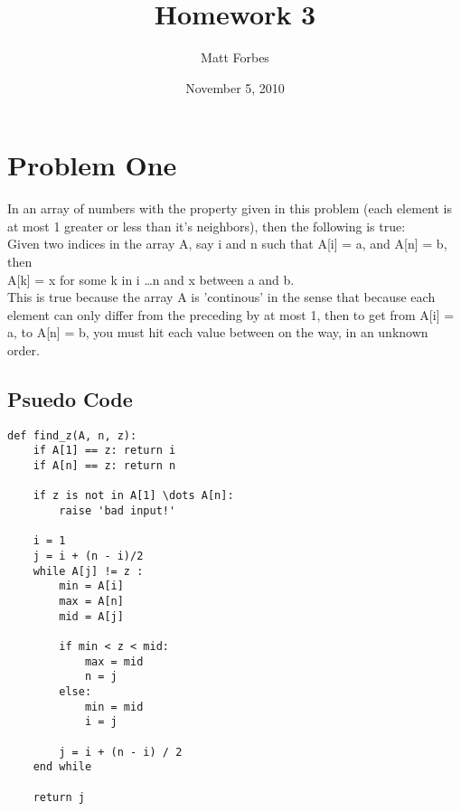 \documentclass[a4paper,12pt]{article}
\begin{document}
\title{Homework 3}
\author{Matt Forbes}
\date{November 5, 2010}
\maketitle

\newenvironment{indentpar}[1]%
{\begin{list}{}%
         {\setlength{\leftmargin}{#1}}%
         \item[]%
}
{\end{list}}

\section{Problem One}

In an array of numbers with the property given in this problem (each element is at most 1 greater or less than 
it's neighbors), then the following is true:\\

\noindent Given two indices in the array A, say i and n such that A[i] = a, and A[n] = b, then\\ A[k] = x
for some k in i \dots n and x between a and b.\\

\noindent This is true because the array A is 'continous' in the sense that because each element can
only differ from the preceding by at most 1, then to get from A[i] = a, to A[n] = b, you must hit each
value between on the way, in an unknown order.

\subsection*{Psuedo Code}
\begin{verbatim}
def find_z(A, n, z):
    if A[1] == z: return i
    if A[n] == z: return n

    if z is not in A[1] \dots A[n]:
        raise 'bad input!'

    i = 1
    j = i + (n - i)/2   
    while A[j] != z :
        min = A[i]
        max = A[n]
        mid = A[j]

        if min < z < mid:  
            max = mid
            n = j
        else:
            min = mid
            i = j
        
        j = i + (n - i) / 2   
    end while
    
    return j

\end{verbatim}
\end{document}
